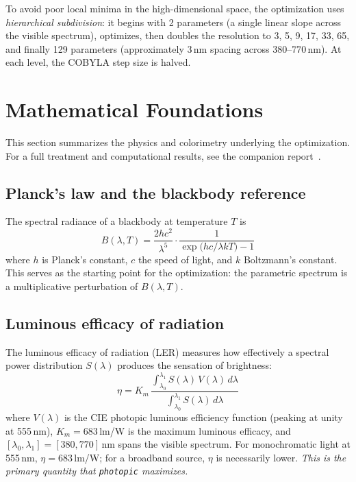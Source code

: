 \documentclass[11pt]{article}
\newcommand{\photopic}{\texttt{photopic}}
\begin{document}
To avoid poor local minima in the high-dimensional space, the optimization
uses \emph{hierarchical subdivision}: it begins with 2 parameters (a
single linear slope across the visible spectrum), optimizes, then doubles
the resolution to 3, 5, 9, 17, 33, 65, and finally 129 parameters
(approximately 3\,nm spacing across 380--770\,nm).  At each level, the
COBYLA step size is halved.

\section{Mathematical Foundations}
\label{sec:math}

This section summarizes the physics and colorimetry underlying the
optimization.  For a full treatment and computational results, see the
companion report~\cite{nystrom2026}.

\subsection{Planck's law and the blackbody reference}

The spectral radiance of a blackbody at temperature $T$ is
\begin{equation}
  B(\lambda, T) = \frac{2hc^2}{\lambda^5}
    \cdot \frac{1}{\exp\!\bigl(hc / \lambda k T\bigr) - 1}
  \label{eq:planck}
\end{equation}
where $h$ is Planck's constant, $c$ the speed of light, and $k$
Boltzmann's constant.  This serves as the starting point for the
optimization: the parametric spectrum is a multiplicative perturbation
of $B(\lambda, T)$.

\subsection{Luminous efficacy of radiation}

The luminous efficacy of radiation (LER) measures how effectively a
spectral power distribution $S(\lambda)$ produces the sensation of
brightness:
\begin{equation}
  \eta = K_m \,
    \frac{\displaystyle\int_{\lambda_0}^{\lambda_1}
      S(\lambda)\, V(\lambda)\, d\lambda}
    {\displaystyle\int_{\lambda_0}^{\lambda_1}
      S(\lambda)\, d\lambda}
  \label{eq:ler}
\end{equation}
where $V(\lambda)$ is the CIE photopic luminous efficiency function
(peaking at unity at 555\,nm), $K_m = 683$\,lm/W is the maximum
luminous efficacy, and $[\lambda_0, \lambda_1] = [380, 770]$\,nm
spans the visible spectrum.  For monochromatic light at 555\,nm,
$\eta = 683$\,lm/W; for a broadband source, $\eta$ is necessarily
lower.  \emph{This is the primary quantity that \photopic{} maximizes.}
\end{document}
